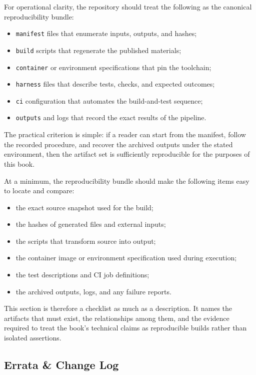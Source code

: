 \documentclass[11pt]{article}
\begin{document}
For operational clarity, the repository should treat the following as the canonical reproducibility bundle:
\begin{itemize}
  \item \texttt{manifest} files that enumerate inputs, outputs, and hashes;
  \item \texttt{build} scripts that regenerate the published materials;
  \item \texttt{container} or environment specifications that pin the toolchain;
  \item \texttt{harness} files that describe tests, checks, and expected outcomes;
  \item \texttt{ci} configuration that automates the build-and-test sequence;
  \item \texttt{outputs} and logs that record the exact results of the pipeline.
\end{itemize}

The practical criterion is simple: if a reader can start from the manifest, follow the recorded procedure, and recover the archived outputs under the stated environment, then the artifact set is sufficiently reproducible for the purposes of this book.

At a minimum, the reproducibility bundle should make the following items easy to locate and compare:
\begin{itemize}
  \item the exact source snapshot used for the build;
  \item the hashes of generated files and external inputs;
  \item the scripts that transform source into output;
  \item the container image or environment specification used during execution;
  \item the test descriptions and CI job definitions;
  \item the archived outputs, logs, and any failure reports.
\end{itemize}

This section is therefore a checklist as much as a description. It names the artifacts that must exist, the relationships among them, and the evidence required to treat the book's technical claims as reproducible builds rather than isolated assertions.



\subsection{Errata \& Change Log}
\end{document}
